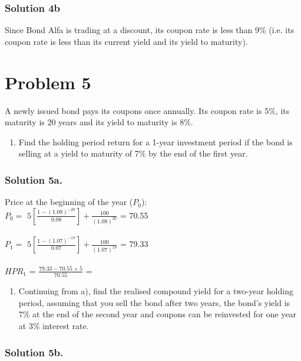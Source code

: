 \documentclass[12]{article}
\begin{document}
\color{blue}
\subsubsection*{Solution 4b}
Since Bond Alfa is trading at a discount, its coupon rate is less than 9\% (i.e. its coupon rate is less than its current yield and its yield to maturity).



\color{black}
\section*{Problem 5}
A newly issued bond pays its coupons once annually. Its coupon rate is 5\%, its maturity is 20 years and its yield to maturity is 8\%.
\begin{enumerate}
    \item[a)] Find the holding period return for a 1-year investment period if the bond is selling at a yield to maturity of 7\% by the end of the first year.
\end{enumerate}
\color{blue}
\subsubsection*{Solution 5a.}
Price at the beginning of the year ($P_0$):\\
$P_0 = $ {\Large $5[\frac{1 - (1.08)^{-20}}{0.08}] + \frac{100}{(1.08)^{20}}$} = 70.55\\
\\
$P_1 = $ {\Large $5[\frac{1 - (1.07)^{-19}}{0.07}] + \frac{100}{(1.07)^{19}}$} = 79.33\\
\\
$HPR_1$ = {\Large $\frac{79.33 - 70.55 + 5}{70.55}$ }= \\


\color{black}
\begin{enumerate}
    \item[b)] Continuing from a), find the realised compound yield for a two-year holding period, assuming that you sell the bond after two years, the bond's yield is 7\% at the end of the second year and coupons can be reinvested for one year at 3\% interest rate.
\end{enumerate}

\color{blue}
\subsubsection*{Solution 5b.}
\end{document}
